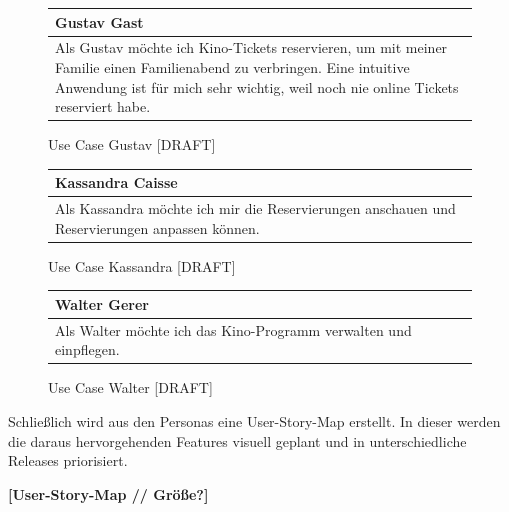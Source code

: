 		\begin{figure}[H]
			\begin{tabular}{p{13cm}}
				\textbf{Gustav Gast} \\\toprule
				Als Gustav möchte ich Kino-Tickets reservieren, um mit meiner Familie einen Familienabend zu verbringen. Eine intuitive Anwendung ist für mich sehr wichtig, weil noch nie online Tickets reserviert habe. 
			\end{tabular}
			\caption[Use Case Gustav]{\label{fig:useCaseGustav} Use Case Gustav [DRAFT]}
		\end{figure}
	
		\begin{figure}[H]
			\begin{tabular}{p{13cm}}
				\textbf{Kassandra Caisse} \\\toprule
				Als Kassandra möchte ich mir die Reservierungen anschauen und Reservierungen anpassen können. 
			\end{tabular}
			\caption[Use Case Kassandra]{\label{fig:useCaseKassandra} Use Case Kassandra [DRAFT]}
		\end{figure}

		\begin{figure}[H]
			\begin{tabular}{p{13cm}}
				\textbf{Walter Gerer} \\\toprule
				Als Walter möchte ich das Kino-Programm verwalten und einpflegen. 
			\end{tabular}
			\caption[Use Case Walter]{\label{fig:useCaseWalter} Use Case Walter [DRAFT]}
		\end{figure}
		
		Schließlich wird aus den Personas eine User-Story-Map erstellt. In dieser werden die daraus hervorgehenden Features visuell geplant und in unterschiedliche Releases priorisiert. 
		
	\begin{center}
		{\textbf{[User-Story-Map // Größe?]}}
	\end{center}
		
	 	
